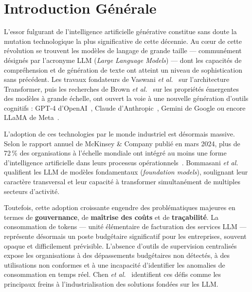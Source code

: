 
\chapter*{Introduction Générale}

\vspace{0.5cm}

L'essor fulgurant de l'intelligence artificielle générative constitue sans doute la mutation technologique la plus significative de cette décennie. Au c\oe ur de cette révolution se trouvent les modèles de langage de grande taille --- communément désignés par l'acronyme LLM (\textit{Large Language Models}) --- dont les capacités de compréhension et de génération de texte ont atteint un niveau de sophistication sans précédent. Les travaux fondateurs de Vaswani \textit{et al.}~\cite{vaswani2017} sur l'architecture Transformer, puis les recherches de Brown \textit{et al.}~\cite{brown2020} sur les propriétés émergentes des modèles à grande échelle, ont ouvert la voie à une nouvelle génération d'outils cognitifs : GPT-4 d'OpenAI~\cite{openai2023}, Claude d'Anthropic~\cite{anthropic2024}, Gemini de Google ou encore LLaMA de Meta~\cite{touvron2023}.

L'adoption de ces technologies par le monde industriel est désormais massive. Selon le rapport annuel de McKinsey \& Company publié en mars 2024, plus de 72\,\% des organisations à l'échelle mondiale ont intégré au moins une forme d'intelligence artificielle dans leurs processus opérationnels~\cite{mckinsey2024}. Bommasani \textit{et al.}~\cite{bommasani2022} qualifient les LLM de \og modèles fondamentaux \fg{} (\textit{foundation models}), soulignant leur caractère transversal et leur capacité à transformer simultanément de multiples secteurs d'activité.

\vspace{0.3cm}

Toutefois, cette adoption croissante engendre des problématiques majeures en termes de \textbf{gouvernance}, de \textbf{maîtrise des coûts} et de \textbf{traçabilité}. La consommation de tokens --- unité élémentaire de facturation des services LLM --- représente désormais un poste budgétaire significatif pour les entreprises, souvent opaque et difficilement prévisible. L'absence d'outils de supervision centralisés expose les organisations à des dépassements budgétaires non détectés, à des utilisations non conformes et à une incapacité d'identifier les anomalies de consommation en temps réel. Chen \textit{et al.}~\cite{chen2024llmops} identifient ces défis comme les principaux freins à l'industrialisation des solutions fondées sur les LLM.

